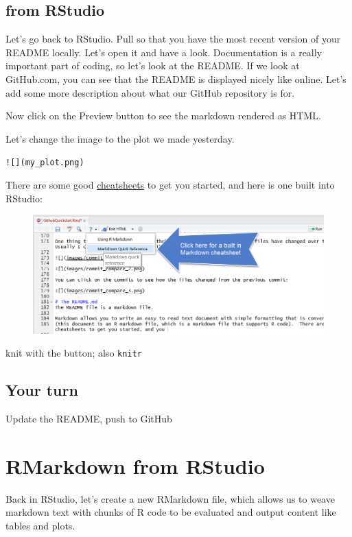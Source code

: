 \documentclass[]{book}
\theoremstyle{definition}
\theoremstyle{definition}
\theoremstyle{definition}
\theoremstyle{remark}
\begin{document}
\subsection{from RStudio}\label{from-rstudio}

Let's go back to RStudio. Pull so that you have the most recent version
of your README locally. Let's open it and have a look. Documentation is
a really important part of coding, so let's look at the README. If we
look at GitHub.com, you can see that the README is displayed nicely like
online. Let's add some more description about what our GitHub repository
is for.

Now click on the Preview button to see the markdown rendered as HTML.

Let's change the image to the plot we made yesterday.

\texttt{!{[}{]}(my\_plot.png)}

There are some good
\href{https://github.com/adam-p/markdown-here/wiki/Markdown-Here-Cheatsheet}{cheatsheets}
to get you started, and here is one built into RStudio:

\begin{figure}[htbp]
\centering
\includegraphics{img/md_cheatsheet.png}
\caption{}
\end{figure}

knit with the button; also \texttt{knitr}

\subsection{Your turn}\label{your-turn-11}

Update the README, push to GitHub

\section{RMarkdown from RStudio}\label{rmarkdown-from-rstudio}

Back in RStudio, let's create a new RMarkdown file, which allows us to
weave markdown text with chunks of R code to be evaluated and output
content like tables and plots.
\end{document}
